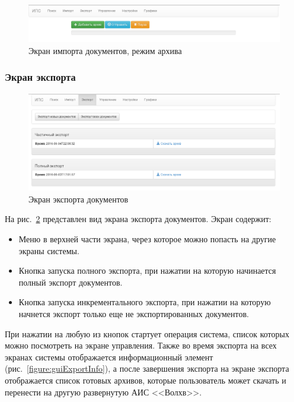   \begin{figure}[h!]
  \centering
  \includegraphics[width=0.9\linewidth]{technology/gui_import_archive}
  \caption{Экран импорта документов, режим архива}
  \label{figure:guiImportArchive}
  \end{figure}

\clearpage
\subsubsection{Экран экспорта}

  \begin{figure}[h!]
  \centering
  \includegraphics[width=0.9\linewidth]{technology/gui_export}
  \caption{Экран экспорта документов}
  \label{figure:guiExport}
  \end{figure}

  На рис.~\ref{figure:guiExport} представлен вид экрана экспорта документов. Экран содержит:
  \begin{itemize}
  \item Меню в верхней части экрана, через которое можно попасть на другие экраны системы.
  \item Кнопка запуска полного экспорта, при нажатии на которую начинается полный экспорт документов.
  \item Кнопка запуска инкрементального экспорта, при нажатии на которую начнется экспорт только еще не экспортированных документов.
  \end{itemize}

  При нажатии на любую из кнопок стартует операция система, список которых можно посмотреть на экране управления. Также во время экспорта на всех экранах системы отображается информационный элемент (рис.~\ref{figure:guiExportInfo}), а после завершения экспорта на экране экспорта отображается список готовых архивов, которые пользователь может скачать и перенести на другую развернутую АИС <<Волхв>>.

